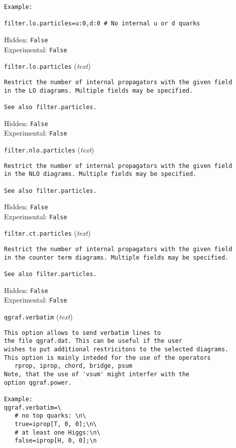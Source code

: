 \begin{basedescript}{\desclabelstyle{\pushlabel}}
\begin{verbatim}
Example:

filter.lo.particles=u:0,d:0 # No internal u or d quarks
\end{verbatim}
Hidden: \verb|False|
\\Experimental: \verb|False|
\\\item[\colorbox{gray!30}{\texttt{filter.lo.particles}}] (\textit{text})
\begin{verbatim}
Restrict the number of internal propagators with the given field
in the LO diagrams. Multiple fields may be specified.

See also filter.particles.
\end{verbatim}
Hidden: \verb|False|
\\Experimental: \verb|False|
\\\item[\colorbox{gray!30}{\texttt{filter.nlo.particles}}] (\textit{text})
\begin{verbatim}
Restrict the number of internal propagators with the given field
in the NLO diagrams. Multiple fields may be specified.

See also filter.particles.
\end{verbatim}
Hidden: \verb|False|
\\Experimental: \verb|False|
\\\item[\colorbox{gray!30}{\texttt{filter.ct.particles}}] (\textit{text})
\begin{verbatim}
Restrict the number of internal propagators with the given field
in the counter term diagrams. Multiple fields may be specified.

See also filter.particles.
\end{verbatim}
Hidden: \verb|False|
\\Experimental: \verb|False|
\\\item[\colorbox{gray!30}{\texttt{qgraf.verbatim}}] (\textit{text})
\begin{verbatim}
This option allows to send verbatim lines to
the file qgraf.dat. This can be useful if the user
wishes to put additional restricitons to the selected diagrams.
This option is mainly inteded for the use of the operators
   rprop, iprop, chord, bridge, psum
Note, that the use of 'vsum' might interfer with the
option qgraf.power.

Example:
qgraf.verbatim=\
   # no top quarks: \n\
   true=iprop[T, 0, 0];\n\
   # at least one Higgs:\n\
   false=iprop[H, 0, 0];\n


\end{verbatim}
\end{basedescript}

